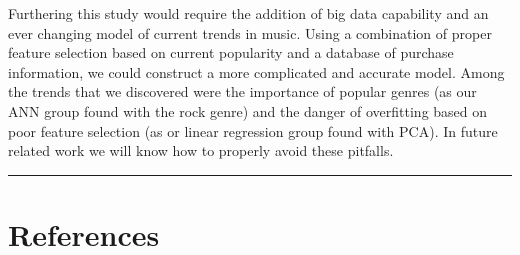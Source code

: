 \documentclass[12pt]{article}
\newcommand{\horizontalLine}{
	\begin{center}
		\hrule width 1.0\textwidth
	\end{center}
}
\begin{document}
Furthering this study would require the addition of big data capability and an ever changing model of current trends in music. Using a combination of proper feature selection based on current popularity and a database of purchase information, we could construct a more complicated and accurate model. Among the trends that we discovered were the importance of popular genres (as our ANN group found with the rock genre) and the danger of overfitting based on poor feature selection (as or linear regression group found with PCA). In future related work we will know how to properly avoid these pitfalls.
\horizontalLine
\section{References}
\label{sec:references}
\end{document}
